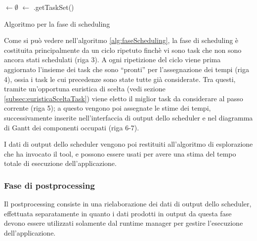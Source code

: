 \IncMargin{1em}
\begin{algorithm}[!htbp]
 
 \BlankLine
 \SchedulerOutput $\leftarrow \emptyset$\;
 \UnscheduledSet $\leftarrow$ \SchedulerInput.getTaskSet()\;
 \Return{\SchedulerOutput}
\caption{Algoritmo per la fase di scheduling}
\label{alg:faseScheduling}
\end{algorithm}
\DecMargin{1em}

Come si può vedere nell'algoritmo \ref{alg:faseScheduling}, la fase di 
scheduling è costituita principalmente da un ciclo ripetuto finchè vi sono 
task che non sono ancora stati schedulati (riga 3). A ogni ripetizione del ciclo viene 
prima aggiornato l'insieme dei task che sono ``pronti'' per l'assegnazione dei 
tempi (riga 4), ossia i task le cui precedenze sono state tutte già considerate. Tra 
questi, tramite un'opportuna euristica di scelta (vedi sezione 
\ref{subsec:euristicaSceltaTask}) viene eletto il miglior task da considerare al 
passo corrente (riga 5); a questo vengono poi assegnate le stime dei tempi, 
successivamente inserite nell'interfaccia di output dello scheduler e nel 
diagramma di Gantt dei componenti occupati (riga 6-7).

I dati di output dello scheduler vengono poi restituiti all'algoritmo di 
esplorazione che ha invocato il tool, e possono essere usati per avere una 
stima del tempo totale di esecuzione dell'applicazione.


\subsubsection{Fase di postprocessing}
Il postprocessing consiste in una rielaborazione dei dati di output dello 
scheduler, effettuata separatamente in quanto i dati prodotti in output da 
questa fase devono essere utilizzati solamente dal runtime manager per gestire 
l'esecuzione dell'applicazione.

